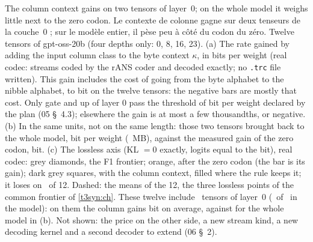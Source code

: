   {The column context gains on two tensors of layer~0; on the whole model it weighs little next to the zero codon.}
  {Le contexte de colonne gagne sur deux tenseurs de la couche~0 ; sur le modèle entier, il pèse peu à côté du codon du zéro.}
  {Twelve tensors of gpt-oss-20b (four depths only: 0, 8, 16, 23). (a) The rate gained by adding the input
   column class to the byte context $\kappa$, in bits per weight (real codec: streams coded by the rANS coder and
   decoded exactly; no \texttt{.trc} file written). This gain includes the cost of going from the byte alphabet to
   the nibble alphabet, \CodonNum{\CodonNColonneAlphabetMin} to \CodonNum{\CodonNColonneAlphabetMax} bit on the
   twelve tensors: the negative bars are mostly that cost. Only gate and up of layer 0 pass the threshold of \CodonNum{\CodonNColonneSeuil} bit per weight declared
   by the plan (05 §~4.3); elsewhere the gain is at most a few thousandths, or negative. (b) In the same units, not
   on the same length: those two tensors brought back to the whole model, \CodonNum{\CodonNColonneModele} bit per
   weight (\CodonNum{\CodonNColonneMo}~MB), against the measured gain of the zero codon, \CodonNum{\CodonNZeroGain}
   bit. (c) The lossless axis (KL $=0$ exactly, logits equal to the bit), real codec: grey diamonds, the F1
   frontier; orange, after the zero codon (the bar is its gain); dark grey squares, with the column context, filled
   where the rule keeps it; it loses on \CodonNSansPertePerd\ of 12. Dashed: the means of the 12, the three lossless
   points of the common frontier of \cref{t3syn:ch}. These twelve include \CodonNSansPerteCouchesZero\ tensors of
   layer~0 (\CodonNSansPerteCouchesZero\ of \CodonNRoueTenseurs\ in the model): on them the column gains \CodonNum{\CodonNSansPerteGainDouze} bit on average,
   against \CodonNum{\CodonNColonneModele} for the whole model in (b). Not shown: the price on the other side, a new stream kind, a new decoding kernel and a second decoder to extend
   (06 §~2).}
